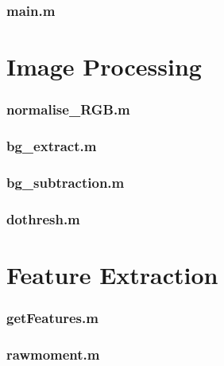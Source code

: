 \subsubsection*{\hypertarget{main}{main.m}}


\newpage
\section{Image Processing}
\subsubsection*{\hypertarget{normRGB}{normalise\_RGB.m}}


\subsubsection*{\hypertarget{bgextract}{bg\_extract.m}}


\subsubsection*{\hypertarget{bgsub}{bg\_subtraction.m}}


\subsubsection*{\hypertarget{dothresh}{dothresh.m}}


\newpage
\section{Feature Extraction}
\subsubsection*{\hypertarget{getfeatures}{getFeatures.m}}


\subsubsection*{\hypertarget{rawmoment}{rawmoment.m}}


